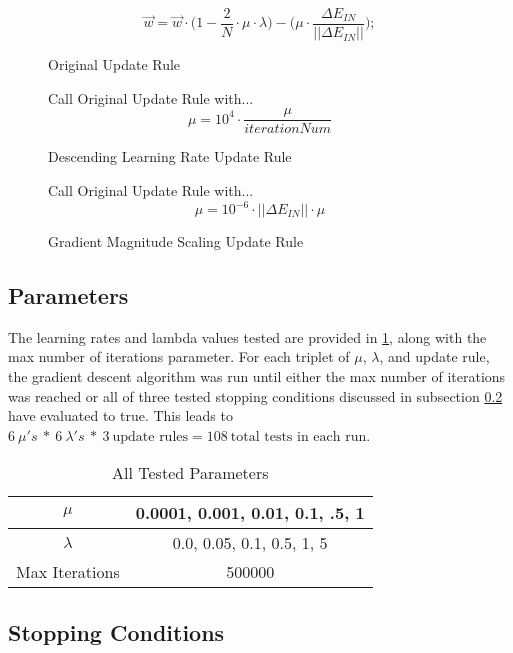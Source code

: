 \documentclass[runningheads]{llncs_2}
\begin{document}
\begin{figure}[!t]
	
\[\vec{w} = \vec{w} \cdot \Big(1 - \frac{2}{N} \cdot \mu \cdot \lambda \Big) - \Big(\mu \cdot \frac{\Delta E_{IN}}{||\Delta E_{IN}||}\Big);
\]
\caption{Original Update Rule}
\label{fig:originalUR} 
\end{figure}

\begin{figure}[!t]
	\centering Call Original Update Rule with... \[ \mu = 10^{4} \cdot \frac{\mu}{iterationNum}\]
	\caption{Descending Learning Rate Update Rule}
	\label{fig:adaptedUR} 
\end{figure}

\begin{figure}[!t]
	\centering Call Original Update Rule with... \[ \mu =  10^{-6} \cdot ||\Delta E_{IN}|| \cdot \mu\]
	\caption{Gradient Magnitude Scaling Update Rule}
	\label{fig:gradientMagUR} 
\end{figure}

\subsection{Parameters}

The learning rates and lambda values tested are provided in \ref{tab:parameters}, along with the max number of iterations parameter. For each triplet of $\mu$, $\lambda$, and update rule, the gradient descent algorithm was run until either the max number of iterations was reached or all of three tested stopping conditions discussed in subsection \ref{subsec:stopping} have evaluated to true. This leads to $6 \ \mu's \ * \ 6 \ \lambda's \ * \ 3 \ \text{update rules} = 108 \ \text{total tests in each run}$. 

\begin{table}[!htbp]
	\centering
	\begin{tabular}	{ | c | c |}
		\hline
		$\mu$& 0.0001, 0.001, 0.01, 0.1, .5, 1 \\ \hline
		$\lambda$ & 0.0, 0.05, 0.1, 0.5, 1, 5 \\ \hline
		Max Iterations & 500000 \\ \hline
	\end{tabular}
	\caption{All Tested Parameters}
	\label{tab:parameters}
\end{table}


\subsection{Stopping Conditions}
\label{subsec:stopping}
\end{document}
